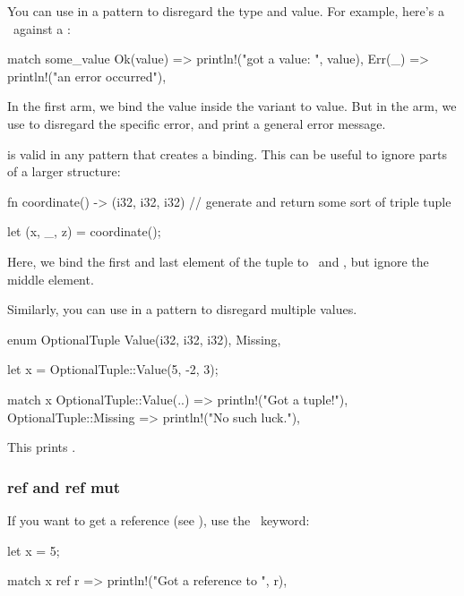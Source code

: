 You can use \code{\_} in a pattern to disregard the type and value. For example, here's a \match\ against a :

\begin{rustc}
match some_value {
    Ok(value) => println!("got a value: {}", value),
    Err(_) => println!("an error occurred"),
}
\end{rustc}

In the first arm, we bind the value inside the  variant to value. But in the  arm, we use \code{\_} to disregard 
the specific error, and print a general error message.

\blank

\code{\_} is valid in any pattern that creates a binding. This can be useful to ignore parts of a larger structure:

\begin{rustc}
fn coordinate() -> (i32, i32, i32) {
    // generate and return some sort of triple tuple
}

let (x, _, z) = coordinate();
\end{rustc}

Here, we bind the first and last element of the tuple to \x\ and \z, but ignore the middle element.

\blank

Similarly, you can use  in a pattern to disregard multiple values.

\begin{rustc}
enum OptionalTuple {
    Value(i32, i32, i32),
    Missing,
}

let x = OptionalTuple::Value(5, -2, 3);

match x {
    OptionalTuple::Value(..) => println!("Got a tuple!"),
    OptionalTuple::Missing => println!("No such luck."),
}
\end{rustc}

This prints .

\subsubsection*{ref and ref mut}

If you want to get a reference (see ), use the \keyref\ keyword:

\begin{rustc}
let x = 5;

match x {
    ref r => println!("Got a reference to {}", r),
}
\end{rustc}

